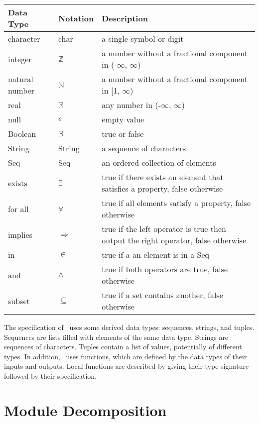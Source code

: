 \documentclass[12pt, titlepage]{article}
\begin{document}
\begin{center}
\renewcommand{\arraystretch}{1.2}
\noindent 
\begin{tabular}{l l p{7.5cm}} 
\toprule 
\textbf{Data Type} & \textbf{Notation} & \textbf{Description}\\ 
\midrule
character & char & a single symbol or digit\\
integer & $\mathbb{Z}$ & a number without a fractional component in (-$\infty$,
$\infty$) \\
natural number & $\mathbb{N}$ & a number without a fractional component in [1,
$\infty$) \\
real & $\mathbb{R}$ & any number in (-$\infty$, $\infty$)\\
null & $\epsilon$ & empty value \\
Boolean & $\mathbb{B}$ & true or false\\
String & String & a sequence of characters\\
Seq & Seq & an ordered collection of elements\\
exists & $\exists$ & true if there exists an element that satisfies a property,
false otherwise\\
for all & $\forall$ & true if all elements satisfy a property, false otherwise\\
implies & $\Rightarrow$ & true if the left operator is true then output the
right operator, false otherwise\\
in & $\in$ & true if a an element is in a Seq\\
and & $\land$ & true if both operators are true, false otherwise\\
subset & $\subseteq$ & true if a set contains another, false otherwise\\
\bottomrule
\end{tabular} 
\end{center}

\noindent
The specification of \progname \ uses some derived data types: sequences,
strings, and tuples. Sequences are lists filled with elements of the same data
type. Strings are sequences of characters. Tuples contain a list of values,
potentially of different types. In addition, \progname \ uses functions, which
are defined by the data types of their inputs and outputs. Local functions are
described by giving their type signature followed by their specification.

\newpage
\section{Module Decomposition}
\end{document}
